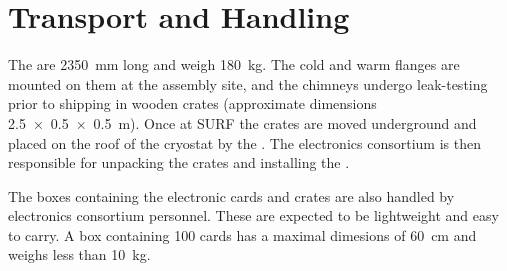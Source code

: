 \section{Transport and Handling}
\label{sec:dp-tpcelec-transport}

The  are \SI{2350}{\mm} long and weigh \SI{180}{\kg}.  The cold and warm flanges are mounted on them at the assembly site, and the chimneys undergo leak-testing prior to shipping in wooden crates (approximate dimensions \SI[product-units=power]{2.5x0.5x0.5}{m}). Once at SURF the crates are moved underground and placed on the roof of the cryostat by the . The \dual electronics consortium is then responsible for unpacking the crates and installing the . 

The boxes containing the electronic cards and  crates are also handled by \dual electronics consortium personnel. These are expected to be lightweight and easy to carry. A box containing \num{100}  cards has a maximal dimesions of \SI{60}{\cm} and weighs less than \SI{10}{\kg}. 

